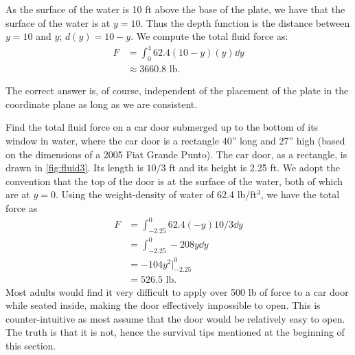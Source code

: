\begin{example}
\begin{enumerate}
	As the surface of the water is 10 ft above the base of the plate, we have that the surface of the water is at $y=10$. Thus the depth function is the distance between $y=10$ and $y$; $d(y) = 10-y$. We compute the total fluid force as:
	\begin{align*}
	F	&=\int_0^4 62.4(10-y)(y)\dd y \\
		&\approx 3660.8\text{ lb}.
	\end{align*}
\end{enumerate}
The correct answer is, of course, independent of the placement of the plate in the coordinate plane as long as we are consistent.
\end{example}

\begin{example}\label{ex_fluid3}
Find the total fluid force on a car door submerged up to the bottom of its window in water, where the car door is a rectangle 40'' long and 27'' high (based on the dimensions of a 2005 Fiat Grande Punto).
\solution
The car door, as a rectangle, is drawn in \autoref{fig:fluid3}. Its length is $10/3$ ft and its height is 2.25 ft. We adopt the convention that the top of the door is at the surface of the water, both of which are at $y=0$. Using the weight-density of water of 62.4 lb/ft$^3$, we have the total force as
%
%
\begin{align*}
	F &=	\int_{-2.25}^0 62.4(-y)10/3\dd y \\
	&= 	\int_{-2.25}^0 -208y\dd y\\
	&= -104y^2\Big|_{-2.25}^0 \\
	&=	526.5 \text{ lb.}
\end{align*}
Most adults would find it very difficult to apply over 500 lb of force to a car door while seated inside, making the door effectively impossible to open. This  is  counter-intuitive as most assume that the door would be relatively easy to open. The truth is that it is not, hence the survival tips mentioned at the beginning of this section.
\end{example}

